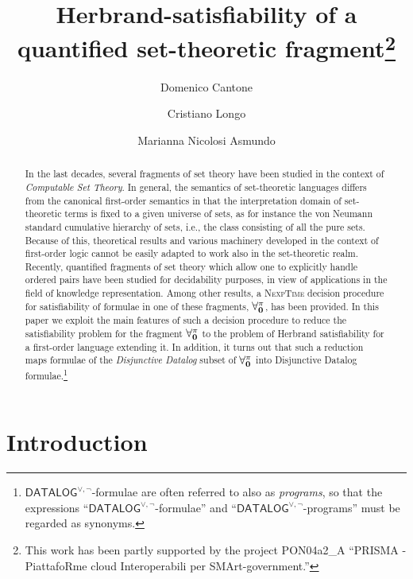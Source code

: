 \documentclass[a4paper]{llncs}
\title{Herbrand-satisfiability of a quantified set-theoretic 
fragment\thanks{This work has been partly supported by the project
PON04a2\_A ``PRISMA - Piat\-tafoRme cloud Interoperabili per 
SMArt-government.''}}
\author{Domenico Cantone \and Cristiano Longo \and Marianna Nicolosi Asmundo}
\institute{Dipartimento di Matematica e Informatica, Universit\`a di 
Catania, Italy\\
\email{\{cantone, longo, nicolosi\}@dmi.unict.it}}
\newcommand{\DisjDatalog}{\ensuremath{\mathsf{DATALOG}^{\vee,\neg}}\xspace}
\begin{document}

\maketitle

\begin{abstract}
In the last decades, several fragments of set theory have been
studied  in the context of \emph{Computable
Set Theory}.
%
In general, the semantics of set-theoretic languages
differs from the canonical first-order semantics in that
the interpretation domain of set-theoretic terms is
fixed to a given universe of sets, as for instance
the von Neumann standard cumulative hierarchy of
sets, i.e., the class consisting of all the pure sets.
Because of this, theoretical results and various
machinery developed in the context of first-order logic
cannot be easily adapted to work also in the set-theoretic
realm.
%
Recently, quantified fragments of set theory
which allow one to explicitly handle ordered pairs have been
studied for decidability purposes, in view of applications in the 
field of knowledge
representation. Among other results, a \textsc{NexpTime}
decision procedure for satisfiability of formulae
in one of these fragments, $\mathbf{\forall_{0}^{\pi}}$, has been provided.
%
In this paper we exploit the main features of such a decision
procedure to reduce the satisfiability problem for the fragment
$\mathbf{\forall_{0}^{\pi}}$ to the problem of Herbrand satisfiability for a
first-order language extending it.  In addition, it turns out that
such a reduction maps formulae of the \emph{Disjunctive Datalog} subset
of $\mathbf{\forall_{0}^{\pi}}$ into Disjunctive Datalog formulae.\footnote{$\DisjDatalog$-formulae are often referred to
also as \emph{programs}, so that the expressions
``\DisjDatalog-formulae'' and ``\DisjDatalog-programs'' must be
regarded as synonyms.}
\end{abstract}

\section{Introduction}\label{INTRO}
\end{document}
